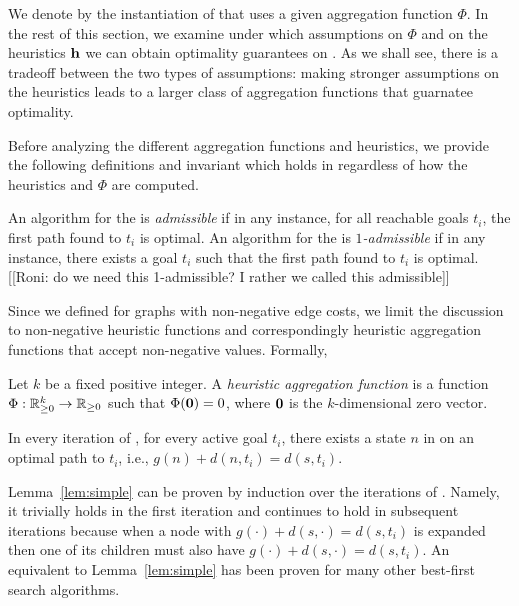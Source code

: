 \label{sec:aggregating}

We denote by \kastarphi the instantiation of \kastar that uses a given aggregation function $\Phi$. In the rest of this section, we examine under which assumptions on $\Phi$ and on the heuristics $\mathbf{h}$ we can obtain optimality guarantees on \kastarphi.
As we shall see, there is a tradeoff between the two types of assumptions: making stronger assumptions on the heuristics leads to a
larger class of aggregation functions that guarnatee optimality. %

Before analyzing the different aggregation functions and heuristics,  we provide the following definitions and invariant which holds in \kastar regardless of how the heuristics and $\Phi$ are computed.

\begin{definition}
  An algorithm for the \kgs is \emph{admissible} if in any instance, for all reachable goals $t_i$, the first path found to $t_i$ is optimal.
  An algorithm for the \kgs is \emph{$1$-admissible} if in any instance, there exists a goal $t_i$ such that the first path found to $t_i$ is optimal.
  [[Roni: do we need this 1-admissible? I rather we called this admissible]]
\end{definition}

Since we defined \kgs for graphs with non-negative edge costs, we limit the discussion to non-negative heuristic functions and correspondingly heuristic aggregation functions that accept non-negative values. Formally,   
\begin{definition}
  Let $k$ be a fixed positive integer.
  A \emph{heuristic aggregation function} is a function $\Phi: \mathbb{R}_{\geq 0}^k \rightarrow \mathbb{R}_{\geq 0}$ such that $\Phi(\mathbf{0}) = 0$, where $\mathbf{0}$ is the $k$-dimensional zero vector.
\end{definition}

\begin{lemma}
  \label{lem:simple}
  In every iteration of \kastar, for every active goal $t_i$, there exists a state $n$ in \open on an optimal path to $t_i$, i.e., $g(n) + d(n, t_i) = d(s, t_i)$.
\end{lemma}

Lemma~\ref{lem:simple} can be proven by induction over the iterations of \kastar.
Namely, it trivially holds in the first iteration and continues to hold in subsequent iterations because when a node with $g(\cdot) + d(s,\cdot) = d(s, t_i)$ is expanded then one of its children must also have $g(\cdot) + d(s,\cdot) = d(s, t_i)$.
An equivalent to Lemma~\ref{lem:simple} has been proven for many other best-first search algorithms.

